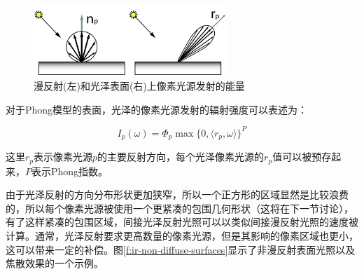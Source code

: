 \begin{figure}
	\sidecaption
	\includegraphics[width=0.65\textwidth]{figures/ir/ir-3-2}
	\caption{漫反射(左)和光泽表面(右)上像素光源发射的能量}
	\label{f:ir-glossy-pixel-light}
\end{figure}

对于Phong模型的表面，光泽的像素光源发射的辐射强度可以表述为：

\begin{equation}\label{e:ir-phong-radiant-intensity}
	I_p(\omega)=\Phi_p \max\{ 0,\langle r_p,\omega\rangle \}^{P}
\end{equation}

\noindent 这里$r_p$表示像素光源$p$的主要反射方向，每个光泽像素光源的$r_p$值可以被预存起来，$P$表示Phong指数。

由于光泽反射的方向分布形状更加狭窄，所以一个正方形的区域显然是比较浪费的，所以每个像素光源被使用一个更紧凑的包围几何形状（这将在下一节讨论），有了这样紧凑的包围区域，间接光泽反射光照可以以类似间接漫反射光照的速度被计算。通常，光泽反射要求更高数量的像素光源，但是其影响的像素区域也更小，这可以带来一定的补偿。图\ref{f:ir-non-diffuse-surfaces}显示了非漫反射表面光照以及焦散效果的一个示例。

